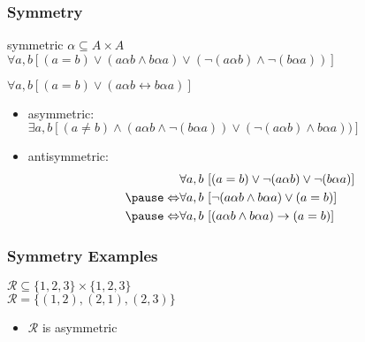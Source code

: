 \documentclass[dvipsnames]{beamer}
\begin{document}
\begin{frame}
  \frametitle{Symmetry}

  \begin{block}{symmetric}
    $\alpha \subseteq A \times A$\\
    $\forall a,b [(a=b) \vee (a \alpha b \wedge b \alpha a)
                        \vee (\neg(a \alpha b) \wedge \neg(b \alpha a))]$

    \pause
    \medskip
    $\forall a,b [(a=b) \vee (a \alpha b \leftrightarrow b \alpha a)]$
  \end{block}

  \pause
  \begin{itemize}

    \item asymmetric:\\
      $\exists a,b [(a \neq b) \wedge (a \alpha b \wedge \neg(b \alpha a))
                               \vee (\neg (a \alpha b) \wedge b \alpha a))]$

    \pause
    \item antisymmetric:
    \begin{eqnarray*}
                      & \forall a,b~
                    [(a=b) \vee \neg(a \alpha b) \vee \neg(b \alpha a)]\\\pause
      \Leftrightarrow & \forall a,b~
                    [\neg(a \alpha b \wedge b \alpha a) \vee (a=b)]\\\pause
      \Leftrightarrow & \forall a,b~
                    [(a \alpha b \wedge b \alpha a) \rightarrow (a=b)]
    \end{eqnarray*}
  \end{itemize}
\end{frame}

\begin{frame}
  \frametitle{Symmetry Examples}

  \begin{example}
    $\mathcal{R} \subseteq \{1,2,3\} \times \{1,2,3\}$\\
    $\mathcal{R} = \{(1,2), (2,1), (2,3)\}$

    \pause
    \medskip
    \begin{itemize}
      \item $\mathcal{R}$ is asymmetric
    \end{itemize}
  \end{example}
\end{frame}
\end{document}
